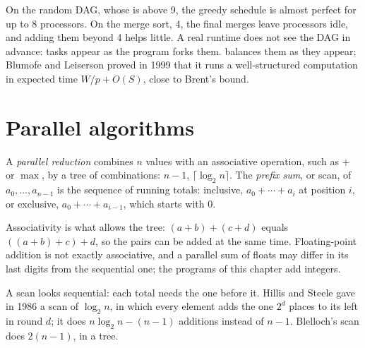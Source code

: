 \label{out:b3:parallel-programming:brent}

On the random DAG, whose  is above 9, the greedy schedule is almost perfect for up to 8 processors. On the merge sort,  4, the final merges leave processors idle, and adding them beyond 4 helps little. A real runtime does not see the DAG in advance: tasks appear as the program forks them.  balances them as they appear; Blumofe and Leiserson proved in 1999 that it runs a well-structured  computation in expected time $W/p + O(S)$, close to Brent's bound. %

\section{Parallel algorithms}\label{sec:b3:parallel-programming:algorithms}

\begin{definition}\label{def:b3:parallel-programming:scan}
A \emph{parallel reduction} combines $n$ values with an associative operation, such as $+$ or $\max$, by a tree of combinations:  $n - 1$,  $\lceil \log_2 n \rceil$. The \emph{prefix sum}, or scan, of $a_0, \ldots, a_{n-1}$ is the sequence of running totals: inclusive, $a_0 + \cdots + a_i$ at position $i$, or exclusive, $a_0 + \cdots + a_{i-1}$, which starts with 0.
\end{definition}

Associativity is what allows the tree: $(a + b) + (c + d)$ equals $((a + b) + c) + d$, so the pairs can be added at the same time. Floating-point addition is not exactly associative, and a parallel sum of floats may differ in its last digits from the sequential one; the programs of this chapter add integers.

A scan looks sequential: each total needs the one before it. Hillis and Steele gave in 1986 a scan of  $\log_2 n$, in which every element adds the one $2^d$ places to its left in round $d$; it does $n \log_2 n - (n - 1)$ additions instead of $n - 1$. %
Blelloch's scan does $2(n - 1)$, in a tree. %

